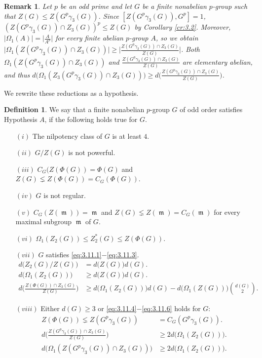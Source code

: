 \documentclass[preprint,sort&compress,12pt]{elsarticle}
\newtheorem{remark}[theorem]{Remark}
\theoremstyle{definition}
\newtheorem{definition}[theorem]{Definition}
\numberwithin{equation}{theorem}
\DeclareMathOperator{\m}{\mathfrak{m}}
\begin{document}
\begin{remark}\label{R:3.10}
Let $p$ be an odd prime and let $G$ be a finite nonabelian $p$-group such that $Z(G)\le Z(G^p\gamma_3(G))$. Since $[Z(G^p\gamma_3(G)), G^p]=1$, $(Z(G^p\gamma_3(G))\cap Z_3(G))^p\le Z(G)$ by Corollary \ref{cr:3.2}. Moreover, $|\Omega_1(A)|=\big|\frac{A}{A^p}\big|$ for every finite abelian $p$-group $A$, so we obtain $\big|\Omega_1(Z(G^p\gamma_3(G))\cap Z_3(G))\big| \ge \big|\frac{Z(G^p\gamma_3(G))\cap Z_3(G)}{Z(G)}\big|$. Both $\Omega_1(Z(G^p\gamma_3(G))\cap Z_3(G))$ and $\frac{Z(G^p\gamma_3(G))\cap Z_3(G)}{Z(G)}$ are elementary abelian, and thus $d\big(\Omega_1(Z_3(G^p\gamma_3(G))\cap Z_3(G))\big)\ge d\bigg(\frac{Z(G^p\gamma_3(G))\cap Z_3(G)}{Z(G)}\bigg)$.
\end{remark}

We rewrite these reductions as a hypothesis.
\begin{definition} 
We say that a finite nonabelian $p$-group $G$ of odd order satisfies Hypothesis $A$, if the following holds true for $G$.
\begin{itemize}
\item [$(i)$] The nilpotency class of $G$ is at least $4$.
\item [$(ii)$] $G/Z(G)$ is not powerful.
\item [$(iii)$] $C_G(Z(\Phi(G))=\Phi(G)$ and $Z(G)\lneq Z(\Phi(G))=C_G(\Phi(G))$.
\item [$(iv)$] $G$ is not regular.
\item [$(v)$] $C_G(Z(\m))=\m$ and $Z(G)\lneq Z(\m)= C_G(\m)$ for every maximal subgroup $\m$ of $G$.
\item [$(vi)$] $\Omega_1(Z_2(G))\le Z_2^*(G)\le Z(\Phi(G))$.
\item [$(vii)$] $G$ satisfies \eqref{eq:3.11.1}$-$\eqref{eq:3.11.3}.
\begin{align}
\label{eq:3.11.1} d\big(Z_2(G)/Z(G)\big)&= d\big(Z(G)\big) d(G).\\
\label{eq:3.11.2} d\big(\Omega_1(Z_2(G))\big)&\ge d\big(Z(G)\big) d(G).\\
\label{eq:3.11.3} d\bigg(\frac{Z(\Phi(G))\cap Z_3(G)}{Z(G)}\bigg)&\ge d\big(\Omega_1(Z_2(G))\big)d(G)- d\big(\Omega_1(Z(G))\big) {{d(G)}\choose{2}}.
\end{align}
\item [$(viii)$] Either $d(G)\ge 3$ or \eqref{eq:3.11.4}$-$\eqref{eq:3.11.6} holds for $G$: 
\begin{align}
\label{eq:3.11.4} Z(\Phi(G))\lneq Z(G^p\gamma_3(G))&= C_G(G^p\gamma_3(G)).\\
\label{eq:3.11.5} d\bigg(\frac{Z(G^p\gamma_3(G))\cap Z_3(G)}{Z(G)}\bigg)&\ge 2d\big(\Omega_1(Z_2(G))\big).\\
\label{eq:3.11.6} d\big(\Omega_1(Z(G^p\gamma_3(G))\cap Z_3(G))\big)&\ge 2d\big(\Omega_1(Z_2(G))\big).
\end{align}
\end{itemize}
\end{definition}
\end{document}

